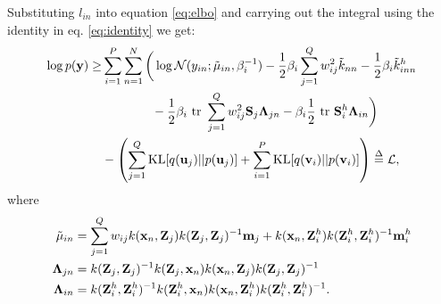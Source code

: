 \documentclass{article} %
\begin{document}

\noindent Substituting $l_{in}$ into equation \ref{eq:elbo} and carrying out the integral using the identity in eq. \ref{eq:identity} we get:
\begin{align}
\nonumber
\log p(\mathbf{y})
\ge& \sum_{i=1}^P \sum_{n=1}^N
\bigg( \log \mathcal{N}(y_{in}; \tilde{\mu}_{in}, \beta_i^{-1})
          - \frac{1}{2} \beta_i \sum_{j=1}^Q w_{ij}^2        \tilde{k}_{nn} - \frac{1}{2} \beta_i \tilde{k}^h_{inn}
 \\ \nonumber
         &\quad \quad \quad \quad - \frac{1}{2} \beta_i \mbox{ \rm tr }  \sum_{j=1}^Q w_{ij}^2 \mathbf{S}_j \mathbf{\Lambda}_{jn} - \beta_i \frac{1}{2} \mbox{ \rm tr } \mathbf{S}^h_i \mathbf{\Lambda}_{in} 
\bigg) \\
&- \left(\sum_{j=1}^Q \text{KL}[q(\mathbf{u}_j) || p(\mathbf{u}_j)] + \sum_{i=1}^P \text{KL}[q(\mathbf{v}_i) || p(\mathbf{v}_i)] \right) \overset{\Delta}{=} \mathcal{L},
\end{align}
where 
\newcommand{\Zg}{\Z_g}
\newcommand{\Zi}{\Z_i}
\begin{align}
\tilde{\mu}_{in}
&= \sum_{j=1}^Q w_{ij} k(\mathbf{x}_n, \mathbf{Z}_j)k(\mathbf{Z}_j,\mathbf{Z}_j)^{-1}\mathbf{m}_j + k(\mathbf{x}_n, \mathbf{Z}^h_i)k(\mathbf{Z}^h_i,\mathbf{Z}^h_i)^{-1}\mathbf{m}^h_i \\
\mathbf{\Lambda}_{jn}
&= k(\mathbf{Z}_j,\mathbf{Z}_j)^{-1} k(\mathbf{Z}_j, \mathbf{x}_n) k(\mathbf{x}_n, \mathbf{Z}_j) k(\mathbf{Z}_j,\mathbf{Z}_j)^{-1} \\
\mathbf{\Lambda}_{in}
&= k(\mathbf{Z}^h_i,\mathbf{Z}^h_i)^{-1} k(\mathbf{Z}^h_i, \mathbf{x}_n) k(\mathbf{x}_n, \mathbf{Z}^h_i) k(\mathbf{Z}^h_i,\mathbf{Z}^h_i)^{-1}.
\end{align}
\end{document}
